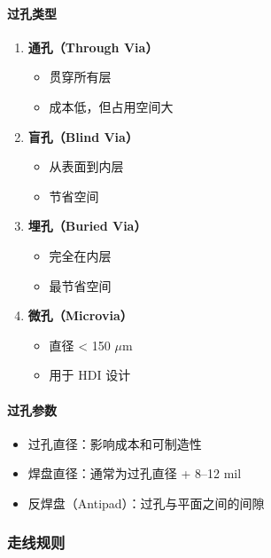 \paragraph{过孔类型}

\begin{enumerate}
  \item \textbf{通孔（Through Via）}
    \begin{itemize}
      \item 贯穿所有层
      \item 成本低，但占用空间大
    \end{itemize}

  \item \textbf{盲孔（Blind Via）}
    \begin{itemize}
      \item 从表面到内层
      \item 节省空间
    \end{itemize}

  \item \textbf{埋孔（Buried Via）}
    \begin{itemize}
      \item 完全在内层
      \item 最节省空间
    \end{itemize}

  \item \textbf{微孔（Microvia）}
    \begin{itemize}
      \item 直径 < 150 $\mu$m
      \item 用于 HDI 设计
    \end{itemize}
\end{enumerate}

\paragraph{过孔参数}

\begin{itemize}
  \item 过孔直径：影响成本和可制造性
  \item 焊盘直径：通常为过孔直径 + 8--12 mil
  \item 反焊盘（Antipad）：过孔与平面之间的间隙
\end{itemize}

\subsubsection{走线规则}

